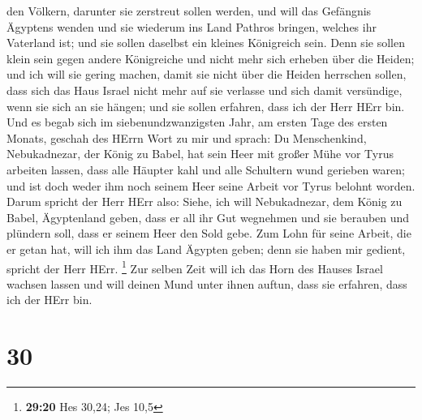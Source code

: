 den Völkern, darunter sie zerstreut sollen werden,  und
will das Gefängnis Ägyptens wenden und sie wiederum ins Land Pathros
bringen, welches ihr Vaterland ist; und sie sollen daselbst ein kleines
Königreich sein.  Denn sie sollen klein sein gegen andere
Königreiche und nicht mehr sich erheben über die Heiden; und ich will
sie gering machen, damit sie nicht über die Heiden herrschen sollen,
 dass sich das Haus Israel nicht mehr auf sie verlasse
und sich damit versündige, wenn sie sich an sie hängen; und sie sollen
erfahren, dass ich der Herr HErr bin.  Und es begab sich
im siebenundzwanzigsten Jahr, am ersten Tage des ersten Monats, geschah
des HErrn Wort zu mir und sprach:  Du Menschenkind,
Nebukadnezar, der König zu Babel, hat sein Heer mit großer Mühe vor
Tyrus arbeiten lassen, dass alle Häupter kahl und alle Schultern wund
gerieben waren; und ist doch weder ihm noch seinem Heer seine Arbeit vor
Tyrus belohnt worden.  Darum spricht der Herr HErr also:
Siehe, ich will Nebukadnezar, dem König zu Babel, Ägyptenland geben,
dass er all ihr Gut wegnehmen und sie berauben und plündern soll, dass
er seinem Heer den Sold gebe.  Zum Lohn für seine Arbeit,
die er getan hat, will ich ihm das Land Ägypten geben; denn sie haben
mir gedient, spricht der Herr HErr. \footnote{\textbf{29:20} Hes 30,24;
  Jes 10,5}  Zur selben Zeit will ich das Horn des Hauses
Israel wachsen lassen und will deinen Mund unter ihnen auftun, dass sie
erfahren, dass ich der HErr bin.

\hypertarget{section-29}{%
\section{30}\label{section-29}}

